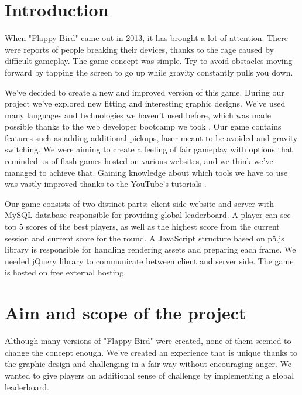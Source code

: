 \documentclass[oneside,a4paper,11pt]{report}
\begin{document}







\chapter{Introduction}
When "Flappy Bird" came out in 2013, it has brought a lot of attention. There were reports of people breaking their devices, thanks to the rage caused by difficult gameplay. The game concept was simple. Try to avoid obstacles moving forward by tapping the screen to go up while gravity constantly pulls you down.

\par
We've decided to create a new and improved version of this game. During our project we've explored new fitting and interesting graphic designs. We've used many languages and technologies we haven't used before, which was made possible thanks to the web developer bootcamp we took \cite{Bootcamp}. Our game contains features such as adding additional pickups, laser meant to be avoided and gravity switching. We were aiming to create a feeling of fair gameplay with options that reminded us of flash games hosted on various websites, and we think we've managed to achieve that. Gaining knowledge about which tools we have to use was vastly improved thanks to the
YouTube's tutorials \cite{CodingTrain} \cite{Phpcourse} \cite{ProgrammingwithMosh}.

\par
Our game consists of two distinct parts: client side website and server with MySQL database responsible for providing global leaderboard. A player can see top 5 scores of the best players, as well as the highest score from the current session and current score for the round. A JavaScript structure based on p5.js library is responsible for handling rendering assets and preparing each frame. We needed jQuery library to communicate between client and server side. The game is hosted on free external hosting.


\chapter{Aim and scope of the project}

Although many versions of "Flappy Bird" were created, none of them seemed to change the concept enough. We've created an experience that is unique thanks to the graphic design and challenging in a fair way without encouraging anger. We wanted to give players an additional sense of challenge by implementing a global leaderboard.
\end{document}
